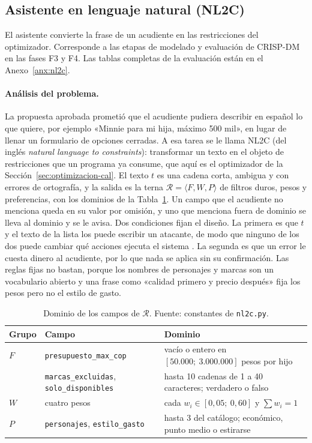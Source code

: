 \subsection{Asistente en lenguaje natural (NL2C)}
\label{sec:nl2c}

El asistente convierte la frase de un acudiente en las restricciones del optimizador. Corresponde a las etapas de modelado y evaluación de CRISP-DM en las fases F3 y F4. Las tablas
completas de la evaluación están en el Anexo~\ref{anx:nl2c}.

\paragraph{Análisis del problema.} La propuesta aprobada prometió que el acudiente pudiera
describir en español lo que quiere, por ejemplo «Minnie para mi hija, máximo 500 mil», en lugar de
llenar un formulario de opciones cerradas. A esa tarea se le llama NL2C (del inglés \emph{natural
language to constraints}): transformar un texto en el objeto de restricciones que un programa ya
consume, que aquí es el optimizador de la Sección~\ref{sec:optimizacion-cal}. El texto $t$ es una
cadena corta, ambigua y con errores de ortografía, y la salida es la terna
$\mathcal{R}=\langle F,W,P\rangle$ de filtros duros, pesos y preferencias, con los dominios de la
Tabla~\ref{tab:nl2c-dominios}. Un campo que el acudiente no menciona queda en su valor por omisión,
y uno que menciona fuera de dominio se lleva al dominio y se le avisa. Dos condiciones fijan el
diseño. La primera es que $t$ y el texto de la lista los puede escribir un atacante, de modo que
ninguno de los dos puede cambiar qué acciones ejecuta el sistema \citep{greshake2023indirect}. La
segunda es que un error le cuesta dinero al acudiente, por lo que nada se aplica sin su
confirmación. Las reglas fijas no bastan, porque los nombres de personajes y marcas son un
vocabulario abierto y una frase como «calidad primero y precio después» fija los pesos pero no el
estilo de gasto.

\begin{table}[!htb]
\centering\footnotesize
\caption{Dominio de los campos de $\mathcal{R}$. Fuente: constantes de \texttt{nl2c.py}.}
\label{tab:nl2c-dominios}
\begin{tabularx}{\textwidth}{@{}p{1.2cm}p{4.2cm}X@{}}
\toprule
Grupo & Campo & Dominio \\
\midrule
$F$ & \texttt{presupuesto\_max\_cop} & vacío o entero en $[50.000;\ 3.000.000]$ pesos por hijo \\
 & \texttt{marcas\_excluidas}, \texttt{solo\_disponibles} & hasta 10 cadenas de 1 a 40 caracteres; verdadero o falso \\
$W$ & cuatro pesos & cada $w_i\in[0{,}05;\ 0{,}60]$ y $\sum w_i=1$ \\
$P$ & \texttt{personajes}, \texttt{estilo\_gasto} & hasta 3 del catálogo; económico, punto medio o estirarse \\
\bottomrule
\end{tabularx}
\end{table}

